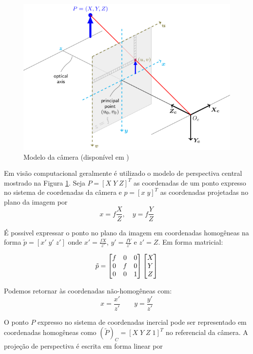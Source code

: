 \begin{figure}[h!]
  \centering
  \includegraphics[width=0.8\linewidth]{./img/camera_model3.png}
\caption{Modelo da câmera (disponível em \citep{opencvCameraCalibration})}
\label{fig:camera_model}
\end{figure}

Em visão computacional geralmente é utilizado o modelo de perspectiva central mostrado na Figura \ref{fig:camera_model}.
Seja ${P} = [X\; Y\; Z]^T$ as coordenadas de um ponto expresso no sistema de coordenadas da câmera e ${p} = [x\;y]^T$ as coordenadas projetadas no plano da imagem por
\begin{equation}
x = f \frac{X}{Z}, \quad y = f \frac{Y}{Z}
\end{equation}

É possivel expressar o ponto no plano da imagem em coordenadas homogêneas na forma $\tilde{{p}} = [x'\; y' \; z']$ onde $x' = \frac{fX}{z'}$, $y' = \frac{fY}{z'}$ e $z' = Z$. Em forma matricial:

\begin{equation}
{\tilde{p}} = 
\begin{bmatrix} f & 0 & 0 \\
	 0 & f & 0 \\
	 0 & 0 & 1	
\end{bmatrix}
\begin{bmatrix}X\\Y\\Z\end{bmatrix}
\end{equation}

Podemos retornar às coordenadas não-homogêneas com:
\[ x = \frac{x'}{z'} \qquad y = \frac{y'}{z'}\]

O ponto ${P}$ expresso no sistema de coordenadas inercial pode ser representado em coordenadas homogêneas como $({\tilde{P}})_C = [X \; Y \; Z \; 1]^T$ no referencial da câmera. A projeção de perspectiva é escrita em forma linear por 

